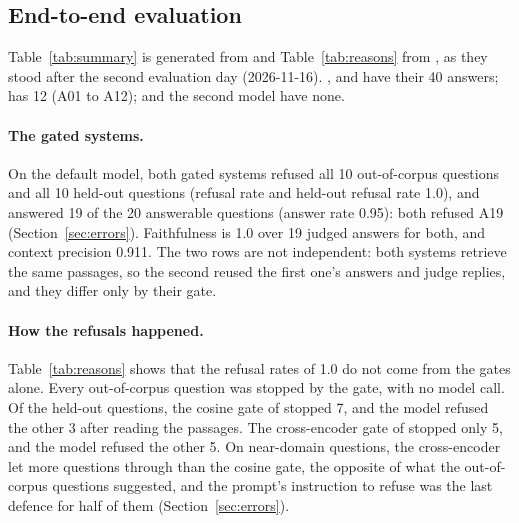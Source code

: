 \subsection{End-to-end evaluation}
\label{sec:e2e}




Table~\ref{tab:summary} is generated from  and Table~\ref{tab:reasons} from , as they stood after the second evaluation day (2026-11-16). ,  and  have their 40 answers;  has 12 (A01 to A12);  and the second model have none. 

\paragraph{The gated systems.} On the default model, both gated systems refused all 10 out-of-corpus questions and all 10 held-out questions (refusal rate and held-out refusal rate 1.0), and answered 19 of the 20 answerable questions (answer rate 0.95): both refused A19 (Section~\ref{sec:errors}). Faithfulness is 1.0 over 19 judged answers for both, and context precision 0.911. The two rows are not independent: both systems retrieve the same passages, so the second reused the first one's answers and judge replies, and they differ only by their gate.

\paragraph{How the refusals happened.} Table~\ref{tab:reasons} shows that the refusal rates of 1.0 do not come from the gates alone. Every out-of-corpus question was stopped by the gate, with no model call. Of the held-out questions, the cosine gate of  stopped 7, and the model refused the other 3 after reading the passages. The cross-encoder gate of  stopped only 5, and the model refused the other 5. On near-domain questions, the cross-encoder let more questions through than the cosine gate, the opposite of what the out-of-corpus questions suggested, and the prompt's instruction to refuse was the last defence for half of them (Section~\ref{sec:errors}).

